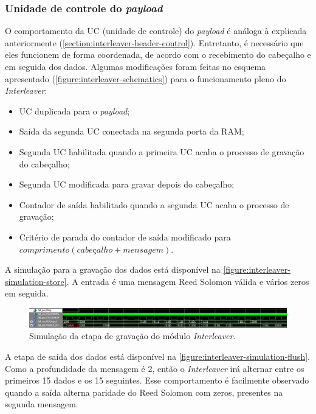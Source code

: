 	\subsubsection{Unidade de controle do \textit{payload}}

	O comportamento da UC (unidade de controle) do \textit{payload} é análoga à explicada anteriormente (\autoref{section:interleaver-header-control}). Entretanto, é necessário que eles funcionem de forma coordenada, de acordo com o recebimento do cabeçalho e em seguida dos dados. Algumas modificações foram feitas no esquema apresentado (\autoref{figure:interleaver-schematics}) para o funcionamento pleno do \textit{Interleaver}:

	\begin{itemize}
		\item UC duplicada para o \textit{payload};
		\item Saída da segunda UC conectada na segunda porta da RAM;
		\item Segunda UC habilitada quando a primeira UC acaba o processo de gravação do cabeçalho;
		\item Segunda UC modificada para gravar depois do cabeçalho;
		\item Contador de saída habilitado quando a segunda UC acaba o processo de gravação;
		\item Critério de parada do contador de saída modificado para $comprimento(cabeçalho + mensagem)$.
	\end{itemize}

	A simulação para a gravação dos dados está disponível na \autoref{figure:interleaver-simulation-store}. A entrada é uma mensagem Reed Solomon válida e vários zeros em seguida.
	\begin{figure}[h]
		\caption{\label{figure:interleaver-simulation-store}Simulação da etapa de gravação do módulo \textit{Interleaver}.}
		\centering
		\includegraphics[width=1\textwidth]{interleaver/simulation-store.png}
	\end{figure}

	A etapa de saída dos dados está disponível na \autoref{figure:interleaver-simulation-flush}. Como a profundidade da mensagem é 2, então o \textit{Interleaver} irá alternar entre os primeiros 15 dados e os 15 seguintes. Esse comportamento é facilmente observado quando a saída alterna paridade do Reed Solomon com zeros, presentes na segunda mensagem.


